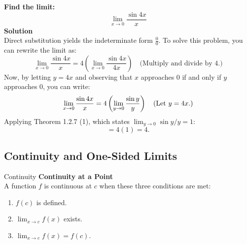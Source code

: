 \documentclass[12pt]{article}
\theoremstyle{beautifulthm}
\begin{document}
\begin{tcolorbox}[colback=examplebg, colframe=red!75!black, title=\textbf{EXAMPLE 9: The Limit of a Rational Function}, fonttitle=\bfseries, sharp corners]
\textbf{Find the limit:}
\[
\lim_{x \to 0} \frac{\sin 4x}{x}
\]
\tcblower
\textbf{Solution} \\
Direct substitution yields the indeterminate form \( \frac{0}{0} \). To solve this problem, you can rewrite the limit as:
\[
\lim_{x \to 0} \frac{\sin 4x}{x} = 4 \left( \lim_{x \to 0} \frac{\sin 4x}{4x} \right) \quad \text{(Multiply and divide by 4.)}
\]
Now, by letting \( y = 4x \) and observing that \( x \) approaches 0 if and only if \( y \) approaches 0, you can write:
\[
\lim_{x \to 0} \frac{\sin 4x}{x} = 4 \left( \lim_{y \to 0} \frac{\sin y}{y} \right) \quad \text{(Let \( y = 4x \).)}
\]
Applying Theorem 1.2.7 (1), which states \( \lim_{y \to 0} \sin y / y = 1 \):
\[
= 4(1) = 4.
\]
\end{tcolorbox}







\newpage

\subsection{Continuity and One-Sided Limits}
\begin{Definition}{ Continuity}{}
\textbf{Continuity at a Point}\\
A function \(f\) is continuous at \(c\) when these three conditions are met:
\begin{enumerate}
    \item \(f(c)\) is defined.
    \item \(\lim_{x \to c} f(x)\) exists.
    \item \(\lim_{x \to c} f(x) = f(c)\).
\end{enumerate}


\end{Definition}
\end{document}
